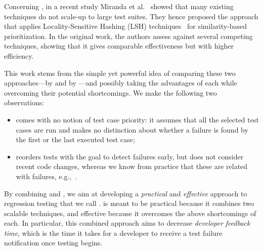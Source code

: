 Concerning \tcp, in a recent  study Miranda et al.~\cite{miranda_fast} showed that many existing techniques do not scale-up to large test suites.
They hence proposed the \fs approach that applies Locality-Sensitive Hashing (LSH) techniques~\cite{Leskovec:2014} for similarity-based prioritization.
In the original work, the authors assess \fs against several competing \tcp techniques, showing that it gives comparable effectiveness but with higher efficiency.

This work stems from the simple yet powerful idea of comparing these two approaches---\tcs by \ek and \tcp by \fs---and possibly taking the advantages of each while overcoming their potential shortcomings. 
%
We make the following two observations:
\begin{itemize}
\item \ek comes with no notion of test case priority: it assumes that all the selected test cases are run and makes no distinction about whether a failure is found by the first or the last executed test case;
\item \fs reorders tests with the goal to detect failures early, but does not consider recent code changes, whereas we know from practice that these are related with failures, e.g.,~\cite{knauss2015supporting,elbaum2014techniques}.
\end{itemize}

By combining \ek and \fs, we  aim at developing 
a \textit{practical} and \textit{effective} approach to regression testing that we call \fz.
\fz is meant to be practical because it combines two scalable techniques, and effective because it overcomes the above shortcomings of each.
In particular, this combined approach aims to decrease \textit{developer feedback time}, which is the time it takes for a developer to receive a test failure notification once testing begins.


